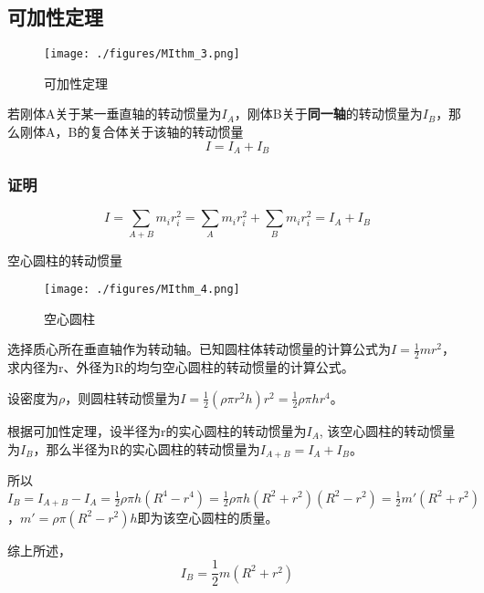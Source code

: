 \subsection{可加性定理}
\begin{figure}[ht]
\centering
\texttt{[image: ./figures/MIthm\_3.png]}
\caption{可加性定理} \label{MIthm_fig3}
\end{figure}
若刚体A关于某一垂直轴的转动惯量为$I_A$，刚体B关于\textbf{同一轴}的转动惯量为$I_B$，那么刚体A，B的复合体关于该轴的转动惯量
\begin{equation}
I=I_A+I_B
\end{equation}

\subsubsection{证明}
\begin{equation}
I=\sum_{A+B} m_i r_i^2=\sum_{A} m_i r_i^2 +\sum_B m_i r_i^2 = I_A+I_B
\end{equation}

\begin{example}{空心圆柱的转动惯量}
\begin{figure}[ht]
\centering
\texttt{[image: ./figures/MIthm\_4.png]}
\caption{空心圆柱} \label{MIthm_fig4}
\end{figure}
选择质心所在垂直轴作为转动轴。已知圆柱体转动惯量的计算公式为$I=\frac{1}{2}mr^2$，求内径为r、外径为R的均匀空心圆柱的转动惯量的计算公式。

设密度为$\rho$，则圆柱转动惯量为$I=\frac{1}{2}(\rho \pi r^2 h) r^2=\frac{1}{2}\rho \pi h r^4$。

根据可加性定理，设半径为r的实心圆柱的转动惯量为$I_A$, 该空心圆柱的转动惯量为$I_B$，那么半径为R的实心圆柱的转动惯量为$I_{A+B}=I_A+I_B$。

所以$I_B=I_{A+B}-I_A=\frac{1}{2}\rho \pi h (R^4-r^4)=\frac{1}{2}\rho \pi h (R^2+r^2)(R^2-r^2)=\frac{1}{2}m'(R^2+r^2)$，$m'=\rho \pi (R^2-r^2) h$即为该空心圆柱的质量。

综上所述，
\begin{equation}
I_B=\frac{1}{2}m(R^2+r^2)
\end{equation}
\end{example}
